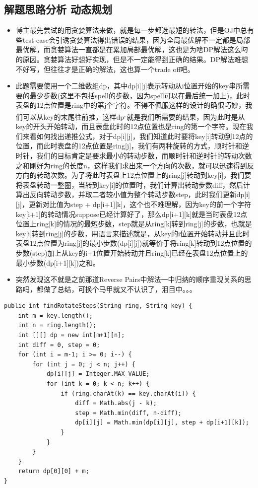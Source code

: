 \documentclass[9pt, b5paaper]{book}
\begin{document}
\subsection{解题思路分析 动态规划}
\label{sec-1-14-2}
\begin{itemize}
\item 博主最先尝试的用贪婪算法来做，就是每一步都选最短的转法，但是OJ中总有些test case会引诱贪婪算法得出错误的结果，因为全局最优解不一定都是局部最优解，而贪婪算法一直都是在累加局部最优解，这也是为啥DP解法这么叼的原因。贪婪算法好想好实现，但是不一定能得到正确的结果。DP解法难想不好写，但往往才是正确的解法，这也算一个trade off吧。
\item 此题需要使用一个二维数组dp，其中dp[i][j]表示转动从i位置开始的key串所需要的最少步数(这里不包括spell的步数，因为spell可以在最后统一加上)，此时表盘的12点位置是ring中的第j个字符。不得不佩服这样的设计的确很巧妙，我们可以从key的末尾往前推，这样dp\footnotemark[2]{}\textsuperscript{,}\,\footnotemark[2]{}就是我们所需要的结果，因为此时是从key的开头开始转动，而且表盘此时的12点位置也是ring的第一个字符。现在我们来看如何找出递推公式，对于dp[i][j]，我们知道此时要将key[i]转动到12点的位置，而此时表盘的12点位置是ring[j]，我们有两种旋转的方式，顺时针和逆时针，我们的目标肯定是要求最小的转动步数，而顺时针和逆时针的转动次数之和刚好为ring的长度n，这样我们求出来一个方向的次数，就可以迅速得到反方向的转动次数。为了将此时表盘上12点位置上的ring[j]转动到key[i]，我们要将表盘转动一整圈，当转到key[i]的位置时，我们计算出转动步数diff，然后计算出反向转动步数，并取二者较小值为整个转动步数step，此时我们更新dp[i][j]，更新对比值为step + dp[i+1][k]，这个也不难理解，因为key的前一个字符key[i+1]的转动情况suppose已经计算好了，那么dp[i+1][k]就是当时表盘12点位置上ring[k]的情况的最短步数，step就是从ring[k]转到ring[j]的步数，也就是key[i]转到ring[j]的步数，用语言来描述就是，从key的i位置开始转动并且此时表盘12点位置为ring[j]的最小步数(dp[i][j])就等价于将ring[k]转动到12点位置的步数(step)加上从key的i+1位置开始转动并且ring[k]已经在表盘12点位置上的最小步数(dp[i+1][k])之和。
\item 突然发现这不就是之前那道Reverse Pairs中解法一中归纳的顺序重现关系的思路吗，都做了总结，可换个马甲就又不认识了，泪目中。。。
\end{itemize}
\begin{verbatim}
public int findRotateSteps(String ring, String key) {
    int m = key.length(); 
    int n = ring.length();
    int [][] dp = new int[m+1][n];
    int diff = 0, step = 0;
    for (int i = m-1; i >= 0; i--) {
        for (int j = 0; j < n; j++) {
            dp[i][j] = Integer.MAX_VALUE;
            for (int k = 0; k < n; k++) {
                if (ring.charAt(k) == key.charAt(i)) {
                    diff = Math.abs(j - k);
                    step = Math.min(diff, n-diff);
                    dp[i][j] = Math.min(dp[i][j], step + dp[i+1][k]);
                }
            }
        }
    }
    return dp[0][0] + m;
}
\end{verbatim}
\end{document}

